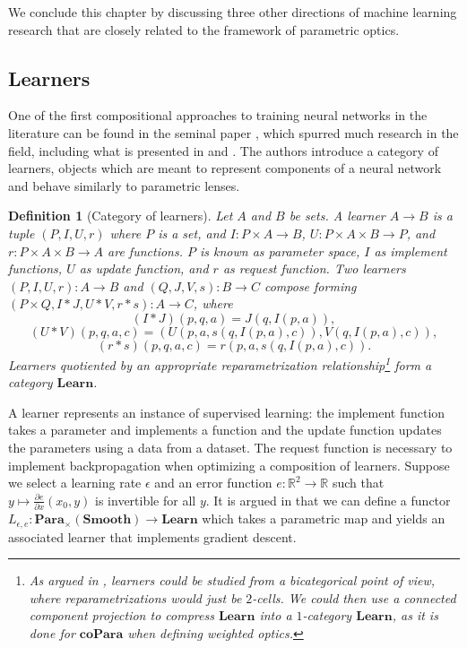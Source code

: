 \documentclass[11pt,a4paper,openright,twoside]{report}
\theoremstyle{plain}
\newtheorem{definition}[proposition]{Definition}
\theoremstyle{definition}
\begin{document}
We conclude this chapter by discussing three other directions of machine learning research that are closely related to the framework of parametric optics.
  

\subsection{Learners}


One of the first compositional approaches to training neural networks in the literature can be found in the seminal paper \cite{fong2019backprop}, which spurred much research in the field, including what is presented in \cite{gavranovic2024fundamental} and \cite{cruttwell2022categorical}. The authors introduce a category of learners, objects which are meant to represent components of a neural network and behave similarly to parametric lenses. 


\begin{definition}[Category of learners]
  Let $A$ and $B$ be sets. A learner $A \to B$ is a tuple $(P, I, U, r)$ where $P$ is a set, and $I: P \times A \to B$, $U: P \times A \times B \to P$, and $r: P \times A \times B \to A$ are functions.
  $P$ is known as parameter space, $I$ as implement functions, $U$ as update function, and $r$ as request function. Two learners $(P, I, U, r): A \to B$ and $(Q, J, V, s): B \to C$ compose forming $(P \times Q, I \ast J, U \ast V, r \ast s ): A \to C$, where
  \[(I \ast J)(p,q,a) = J(q,I(p,a)),\]
  \[(U \ast V)(p,q,a,c) = (U(p,a,s(q,I(p,a),c)), V(q,I(p,a),c)),\]
  \[(r \ast s)(p,q,a,c) = r(p,a,s(q,I(p,a),c)).\]
  Learners quotiented by an appropriate reparametrization relationship\footnote{As argued in \cite{fong2019backprop}, learners could be studied from a bicategorical point of view, where reparametrizations would just be $2$-cells. We could then use a connected component projection to compress $\mathbf{Learn}$ into a $1$-category $\mathbf{Learn}$, as it is done for $\mathbf{coPara}$ when defining weighted optics.} form a category $\mathbf{Learn}$.
\end{definition}

A learner represents an instance of supervised learning: the implement function takes a parameter and implements a function and the update function updates the parameters using a data from a dataset. The request function is necessary to implement backpropagation when optimizing a composition of learners. Suppose we select a learning rate $\epsilon$ and an error function $e: \mathbb{R}^2 \to \mathbb{R}$ such that $y \mapsto \frac{\partial e }{\partial x}(x_0, y)$ is invertible for all $y$. It is argued in \cite{fong2019backprop} that we can define a functor $L_{\epsilon, e}: \mathbf{Para}_{\times}(\mathbf{Smooth}) \to \mathbf{Learn}$ which takes a parametric map and yields an associated learner that implements gradient descent. 
\end{document}
